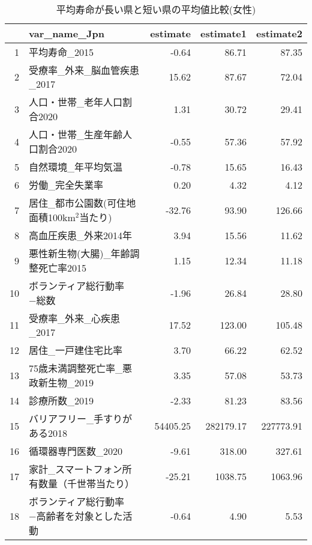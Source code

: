 \begin{table}[ht]
\centering
\caption{平均寿命が長い県と短い県の平均値比較(女性)}
\label{LE_Ttest_d_f.tex}
\begingroup\tiny

\begin{adjustbox}{width=.7\textwidth}
\begin{tabular}{rlrrr}
  \hline
 & var\_name\_Jpn & estimate & estimate1 & estimate2 \\
  \hline
1 & 平均寿命\_2015 & -0.64 & 86.71 & 87.35 \\
  2 & 受療率\_外来\_脳血管疾患\_2017 & 15.62 & 87.67 & 72.04 \\
  3 & 人口・世帯\_老年人口割合2020 & 1.31 & 30.72 & 29.41 \\
  4 & 人口・世帯\_生産年齢人口割合2020 & -0.55 & 57.36 & 57.92 \\
  5 & 自然環境\_年平均気温 & -0.78 & 15.65 & 16.43 \\
  6 & 労働\_完全失業率 & 0.20 & 4.32 & 4.12 \\
  7 & 居住\_都市公園数(可住地面積100km$^2$当たり) & -32.76 & 93.90 & 126.66 \\
  8 & 高血圧疾患\_外来2014年 & 3.94 & 15.56 & 11.62 \\
  9 & 悪性新生物(大腸)\_年齢調整死亡率2015 & 1.15 & 12.34 & 11.18 \\
  10 & ボランティア総行動率−総数 & -1.96 & 26.84 & 28.80 \\
  11 & 受療率\_外来\_心疾患\_2017 & 17.52 & 123.00 & 105.48 \\
  12 & 居住\_一戸建住宅比率 & 3.70 & 66.22 & 62.52 \\
  13 & 75歳未満調整死亡率\_悪政新生物\_2019 & 3.35 & 57.08 & 53.73 \\
  14 & 診療所数\_2019 & -2.33 & 81.23 & 83.56 \\
  15 & バリアフリー\_手すりがある2018 & 54405.25 & 282179.17 & 227773.91 \\
  16 & 循環器専門医数\_2020 & -9.61 & 318.00 & 327.61 \\
  17 & 家計\_スマートフォン所有数量（千世帯当たり） & -25.21 & 1038.75 & 1063.96 \\
  18 & ボランティア総行動率−高齢者を対象とした活動 & -0.64 & 4.90 & 5.53 \\
   \hline
\end{tabular}
\end{adjustbox}

\endgroup
\end{table}
